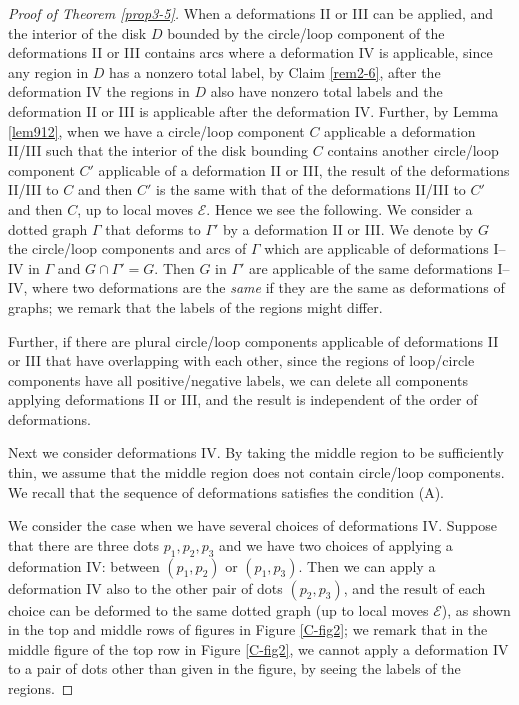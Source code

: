 \documentclass[a4paper,11pt]{amsart}
\numberwithin{equation}{section}
\begin{document}
\begin{proof}[
Proof of Theorem \ref{prop3-5}]
When a deformations II or III can be applied, and the interior of the disk $D$ bounded by the circle/loop component of the deformations II or III contains arcs where a deformation IV is applicable, since any region in $D$ 
has a nonzero total label, by Claim \ref{rem2-6}, after the deformation IV the regions in $D$ also have nonzero total labels and the deformation II or III is applicable after the deformation IV. 
Further, by Lemma \ref{lem912}, when we have a circle/loop component $C$ applicable a deformation II/III  such that the interior of the disk bounding $C$ contains another circle/loop component $C'$ applicable of a deformation II or III, the result of the deformations II/III to $C$ and then $C'$ is the same with that of the deformations II/III to $C'$ and then $C$, up to local moves $\mathcal{E}$. 
Hence we see the following. We consider a dotted graph $\Gamma$ that deforms to $\Gamma'$ by a deformation II or III. 
We denote by $G$ the circle/loop components and arcs of $\Gamma$ which are applicable of deformations I--IV in $\Gamma$ and $G \cap \Gamma'=G$. Then $G$ in $\Gamma'$ are applicable of the same deformations I--IV, where two deformations are the {\it same} if they are the same as deformations of graphs; we remark that the labels of the regions might differ.  

Further, if there are plural circle/loop components applicable of deformations II or III that have overlapping with each other, since the regions of loop/circle components have all positive/negative labels, we can delete all components applying deformations II or III, and the result is independent of the order of deformations. 

Next we consider deformations IV. 
By taking the middle region to be sufficiently thin, we assume that the middle region does not contain circle/loop components. 
We recall that the sequence of deformations satisfies the condition (A). 

We consider the case when we have several choices of deformations IV. 
Suppose that there are three dots $p_1, p_2, p_3$ and we 
have two choices of applying a deformation IV: between $(p_1, p_2)$ or $(p_1, p_3)$. Then we can apply a deformation IV also to the other pair of dots $(p_2, p_3)$, and the result of each choice can be deformed to the same dotted graph (up to local moves $\mathcal{E}$), as shown in the top and middle rows of figures in Figure \ref{C-fig2};  
 we remark that in the middle figure of the top row in Figure \ref{C-fig2}, we cannot apply a deformation IV to a pair of dots other than given in the figure, by seeing the labels of the regions. 


\end{proof}
\end{document}
